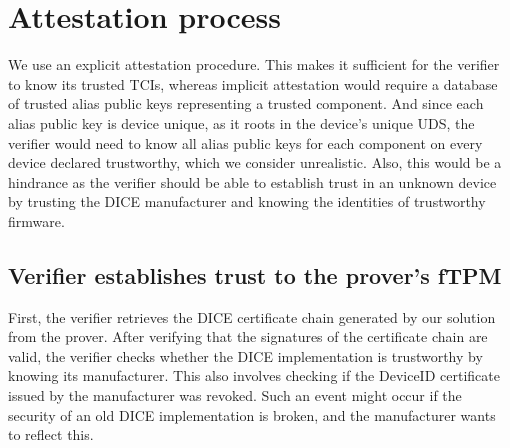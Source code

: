 
\section{Attestation process}\label{sec:attestation_process}


We use an explicit attestation procedure.
This makes it sufficient for the verifier to know its trusted TCIs, whereas implicit attestation would require a database of trusted alias public keys representing a trusted component.
And since each alias public key is device unique, as it roots in the device's unique \ac{UDS}, the verifier would need to know all alias public keys for each component on every device declared trustworthy, which we consider unrealistic.
Also, this would be a hindrance as the verifier should be able to establish trust in an unknown device by trusting the DICE manufacturer and knowing the identities of trustworthy firmware.


\subsection{Verifier establishes trust to the prover's fTPM}\label{subsec:trust_prover_tpm}

First, the verifier retrieves the DICE certificate chain generated by our solution from the prover.
After verifying that the signatures of the certificate chain are valid, the verifier checks whether the DICE implementation is trustworthy by knowing its manufacturer.
This also involves checking if the DeviceID certificate issued by the manufacturer was revoked.
Such an event might occur if the security of an old DICE implementation is broken, and the manufacturer wants to reflect this.

